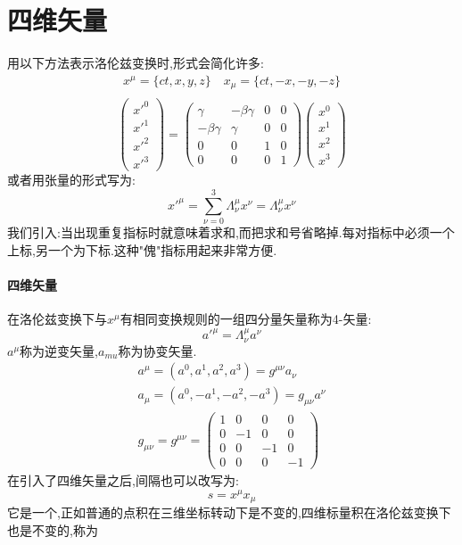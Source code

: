 \section{四维矢量}
用以下方法表示洛伦兹变换时,形式会简化许多:
\begin{equation}
    \begin{gathered}
        x^{\mu}=\{ct,x,y,z\}\quad x_{\mu}=\{ct,-x,-y,-z\}\\
    \end{gathered}
\end{equation}
\begin{equation}
    \begin{pmatrix}
        {x'}^{0}\\{x'}^1\\{x'}^2\\{x'}^3
    \end{pmatrix}
    =\begin{pmatrix}
        \gamma&-\beta\gamma&0&0\\
        -\beta\gamma&\gamma&0&0\\
        0&0&1&0\\
        0&0&0&1
    \end{pmatrix}
    \begin{pmatrix}
        x^0\\x^1\\x^2\\x^3
    \end{pmatrix}
\end{equation}
或者用张量的形式写为:
\begin{equation}
    {x'}^{\mu}=\sum_{\nu=0}^{3}\Lambda_{\nu}^{\mu}x^{\nu}=\Lambda_{\nu}^{\mu}x^{\nu}
\end{equation}
我们引入:当出现重复指标时就意味着求和,而把求和号省略掉.每对指标中必须一个上标,另一个为下标.这种"傀"指标用起来非常方便.
\paragraph{四维矢量}
在洛伦兹变换下与$x^{\mu}$有相同变换规则的一组四分量矢量称为4-矢量:
\begin{equation}
    {a'}^{\mu}=\Lambda_{\nu}^{\mu}a^{\nu}
\end{equation}
$a^{\mu}$称为逆变矢量,$a_{mu}$称为协变矢量.
\begin{gather}
    a^{\mu}=(a^0,a^1,a^2,a^3)=g^{\mu\nu}a_{\nu}\\
    a_{\mu}=(a^0,-a^1,-a^2,-a^3)=g_{\mu\nu}a^{\nu}\\
    g_{\mu\nu}=g^{\mu\nu}=\begin{pmatrix}
        1&0&0&0\\
        0&-1&0&0\\
        0&0&-1&0\\
        0&0&0&-1
    \end{pmatrix}
\end{gather}
在引入了四维矢量之后,间隔也可以改写为:
\begin{equation}
    s=x^{\mu}x_{\mu}
\end{equation}
它是一个,正如普通的点积在三维坐标转动下是不变的,四维标量积在洛伦兹变换下也是不变的,称为
